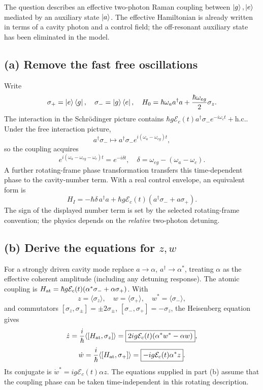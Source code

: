 
The question describes an effective two-photon
Raman coupling between \(\left\lvert g\right\rangle,\left\lvert e\right\rangle\)
mediated by an auxiliary state \(\left\lvert a\right\rangle\).
The effective Hamiltonian is already written
in terms of a cavity photon and a control field;
the off-resonant auxiliary state has been
eliminated in the model.

\subsection*{(a) Remove the fast free oscillations}
Write
\[
\sigma_+=\left\lvert e\right\rangle\left\langle g\right\rvert,\quad
\sigma_-=\left\lvert g\right\rangle\left\langle e\right\rvert,\quad
H_0=\hbar\omega_a a^\dagger a+
\frac{\hbar\omega_{eg}}2\sigma_z.
\]
The interaction in the Schr\"odinger picture
contains
\(\hbar g\mathcal E_c(t)
a^\dagger\sigma_-e^{-i\omega_ct}+\mathrm{h.c.}\).
Under the free interaction picture,
\[
a^\dagger\sigma_-\mapsto
a^\dagger\sigma_-e^{i(\omega_a-\omega_{eg})t},
\]
so the coupling acquires
\[
e^{i(\omega_a-\omega_{eg}-\omega_c)t}
=e^{-i\delta t},
\quad \delta=\omega_{eg}-(\omega_a-\omega_c).
\]
A further rotating-frame phase transformation
transfers this time-dependent phase to the
cavity-number term. With a real control
envelope, an equivalent form is
\[
\boxed{H_I=-\hbar\delta\,a^\dagger a+
\hbar g\mathcal E_c(t)(a^\dagger\sigma_-+
a\sigma_+)}.
\]
The sign of the displayed number term is set
by the selected rotating-frame convention;
the physics depends on the \emph{relative}
two-photon detuning.

\subsection*{(b) Derive the equations for \(z,w\)}
For a strongly driven cavity mode replace
\(a\to\alpha\), \(a^\dagger\to\alpha^*\), treating
\(\alpha\) as the effective coherent amplitude
(including any detuning response).
The atomic coupling is
\(H_{\rm at}=\hbar g\mathcal E_c(t)
(\alpha^*\sigma_-+\alpha\sigma_+)\).
With
\[
z=\langle\sigma_z\rangle,\quad
w=\langle\sigma_+\rangle,\quad
w^*=\langle\sigma_-\rangle,
\]
and commutators
\([\sigma_z,\sigma_\pm]=\pm2\sigma_\pm\),
\([\sigma_-,\sigma_+]=-\sigma_z\),
the Heisenberg equation gives
\[
\dot z=\frac i\hbar\langle[H_{\rm at},\sigma_z]\rangle
=\boxed{2ig\mathcal E_c(t)(\alpha^*w^*-\alpha w)},
\]
\[
\dot w=\frac i\hbar
\langle[H_{\rm at},\sigma_+]\rangle
=\boxed{-ig\mathcal E_c(t)\alpha^* z}.
\]
Its conjugate is
\(\dot w^*=ig\mathcal E_c(t)\alpha z\).
The equations supplied in part (b) assume
that the coupling phase can be taken
time-independent in this rotating description.

